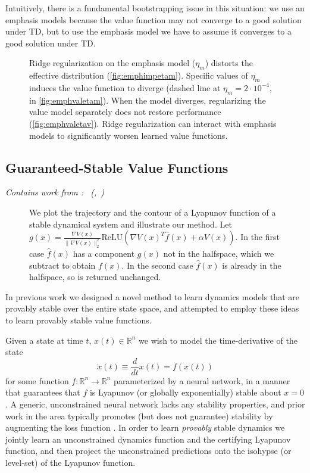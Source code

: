 \documentclass[11pt]{article}
\newcommand{\subsectionsubtitle}[1]{\vspace{-0.5em}\textit{#1}\vspace{0.5em}}
\begin{document}
Intuitively, there is a fundamental bootstrapping issue in this situation: we use an emphasis models because the value function may not converge to a good solution under TD, but to use the emphasis model we have to assume it converges to a good solution under TD.

\begin{figure}
  
  \label{fig:emphasisplotseta}
  \caption{Ridge regularization on the emphasis model ($\eta_m$) distorts the effective distribution (\ref{fig:emphimpetam}). Specific values of $\eta_m$ induces the value function to diverge (dashed line at $\eta_m=2\cdot 10^{-4}$, in \ref{fig:emphvaletam}). When the model diverges, regularizing the value model separately does not restore performance (\ref{fig:emphvaletav}). Ridge regularization can interact with emphasis models to significantly worsen learned value functions. }
\end{figure}


\subsection{Guaranteed-Stable Value Functions}
\subsectionsubtitle{Contains work from \cite{manek2019stable}: \citetitle{manek2019stable}~(\citeauthor{manek2019stable},~\citeyear{manek2019stable})}


\begin{figure}
  
  \caption{We plot the trajectory and the contour of a Lyapunov function of a stable dynamical system and illustrate our method. Let $g( x) = \frac{\nabla V(x)}{\|\nabla V(x)\|_2^2} \mathrm{ReLU}\left(\nabla V(x)^T \hat{f}(x) + \alpha V (x)\right)$. In the first case $\hat f( x)$ has a component $g( x)$ not in the halfspace, which we subtract to obtain $f( x)$. In the second case $\hat f( x)$ is already in the halfspace, so is returned unchanged.}
  \label{fig:stable_nn_construction}
\end{figure}

In previous work \cite{manek2019stable} we designed a novel method to learn dynamics models that are provably stable over the entire state space, and attempted to employ these ideas to learn provably stable value functions.

Given a state at time $t$, $x(t) \in \mathbb{R}^n$ we wish to model the time-derivative of the state
\begin{equation}
\dot{x}(t) \equiv \frac{d}{dt}x(t) = f(x(t))
\end{equation}
for some function $f : \mathbb{R}^n \rightarrow \mathbb{R}^n$ parameterized by a neural network, in a manner that guarantees that $f$ is Lyapunov (or globally exponentially) stable about $x=0$. A generic, unconstrained neural network lacks any stability properties, and prior work in the area typically promotes (but does not guarantee) stability by augmenting the loss function \citep{chow2018lyapunov,richards2018lyapunov,taylor2019episodic}. In order to learn \emph{provably} stable dynamics we jointly learn an unconstrained dynamics function and the certifying Lyapunov function, and then project the unconstrained predictions onto the isohypse (or level-set) of the Lyapunov function.
\end{document}
